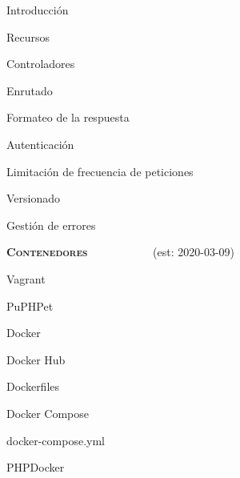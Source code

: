 \begin{longenum}
    \begin{longenum}
        \item Introducción
        \item Recursos
        \item Controladores
        \item Enrutado
        \item Formateo de la respuesta
        \item Autenticación
        \item Limitación de frecuencia de peticiones
        \item Versionado
        \item Gestión de errores
    \end{longenum}
    \item \textbf{\textsc{Contenedores}} \ \ \ \ \ \ \ \ \opcional\ \ \ (est: \mbox{2020-03-09})
    \begin{longenum}
        \item Vagrant
        \begin{longenum}
            \item PuPHPet
        \end{longenum}
        \item Docker
        \begin{longenum}
            \item Docker Hub
            \item Dockerfiles
            \item Docker Compose
            \begin{longenum}
                \item docker-compose.yml
            \end{longenum}
        \end{longenum}
        \item PHPDocker
    \end{longenum}
\end{longenum}
